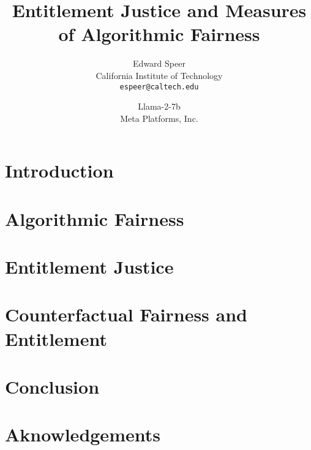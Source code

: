 \documentclass[11pt, a4paper]{article}
\title{Entitlement Justice and Measures of Algorithmic Fairness}
\author{%
  Edward Speer
  \\
  California Institute of Technology\\
  \texttt{espeer@caltech.edu} \\
   \and
  Llama-2-7b \\
  Meta Platforms, Inc. \\
}
\date{\monthyeardate}
\begin{document}
\maketitle

\begin{abstract}
    
\end{abstract}

\section{Introduction}


\section{Algorithmic Fairness}


\section{Entitlement Justice}


\section{Counterfactual Fairness and Entitlement}


\section{Conclusion}


\section*{Aknowledgements}


\end{document}
